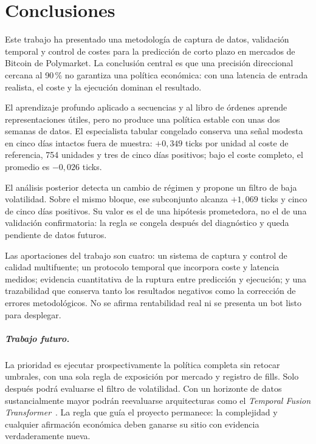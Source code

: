 %
\chapter{Conclusiones}
\label{ch::conclusiones}

Este trabajo ha presentado una metodología de captura de datos, validación temporal y control
de costes para la predicción de corto plazo en mercados de Bitcoin de Polymarket. La
conclusión central es que una precisión direccional cercana al 90\,\% no garantiza una política
económica: con una latencia de entrada realista, el coste y la ejecución dominan el resultado.

El aprendizaje profundo aplicado a secuencias y al libro de órdenes aprende representaciones
útiles, pero no produce una política estable con unas dos semanas de datos. El especialista
tabular congelado conserva una señal modesta en cinco días intactos fuera de muestra:
$+0{,}349$ ticks por unidad al coste de referencia, 754 unidades y tres de cinco días
positivos; bajo el coste completo, el promedio es $-0{,}026$ ticks.

El análisis posterior detecta un cambio de régimen y propone un filtro de baja volatilidad.
Sobre el mismo bloque, ese subconjunto alcanza $+1{,}069$ ticks y cinco de cinco días
positivos. Su valor es el de una hipótesis prometedora, no el de una validación confirmatoria:
la regla se congela después del diagnóstico y queda pendiente de datos futuros.

Las aportaciones del trabajo son cuatro: un sistema de captura y control de calidad
multifuente; un protocolo temporal que incorpora coste y latencia medidos; evidencia
cuantitativa de la ruptura entre predicción y ejecución; y una trazabilidad que conserva tanto
los resultados negativos como la corrección de errores metodológicos. No se afirma
rentabilidad real ni se presenta un bot listo para desplegar.

\paragraph{Trabajo futuro.} La prioridad es ejecutar prospectivamente la política completa
sin retocar umbrales, con una sola regla de exposición por mercado y registro de fills. Solo
después podrá evaluarse el filtro de volatilidad. Con un horizonte de datos sustancialmente
mayor podrán reevaluarse arquitecturas como el \emph{Temporal Fusion
Transformer}~\cite{lim2021tft}. La regla que guía el proyecto permanece: la complejidad y
cualquier afirmación económica deben ganarse su sitio con evidencia verdaderamente nueva.
